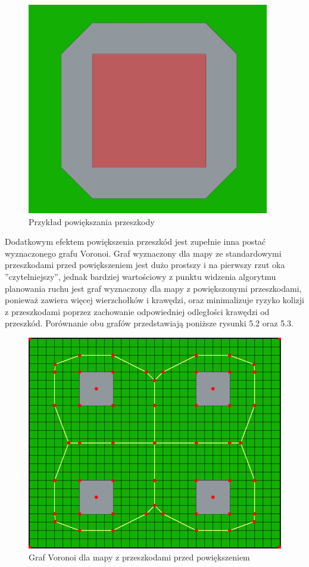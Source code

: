 \documentclass[a4paper,11pt,twoside]{report}
\theoremstyle{definition}
\begin{document}
\begin{figure}[h!]
\centering
\includegraphics[scale=0.5]{expandObstacleExample}
\caption[Przykład powiększania przeszkody]{Przykład powiększania przeszkody}
\end{figure}

Dodatkowym efektem powiększenia przeszkód jest zupełnie inna postać wyznaczonego grafu Voronoi. Graf wyznaczony dla mapy ze standardowymi przeszkodami przed powiększeniem jest dużo prostszy i na pierwszy rzut oka ''czytelniejszy'', jednak bardziej wartościowy z punktu widzenia algorytmu planowania ruchu jest graf wyznaczony dla mapy z powiększonymi przeszkodami, ponieważ zawiera więcej wierzchołków i krawędzi, oraz minimalizuje ryzyko kolizji z przeszkodami poprzez zachowanie odpowiedniej odległości krawędzi od przeszkód. Porównanie obu grafów przedstawiają poniższe rysunki 5.2 oraz 5.3.

\begin{figure}[h!]
\centering
\includegraphics[scale=0.4]{voronoiGraphForMap}
\caption[Graf Voronoi dla mapy z przeszkodami przed powiększeniem]{Graf Voronoi dla mapy z przeszkodami przed powiększeniem}
\end{figure}
\end{document}
